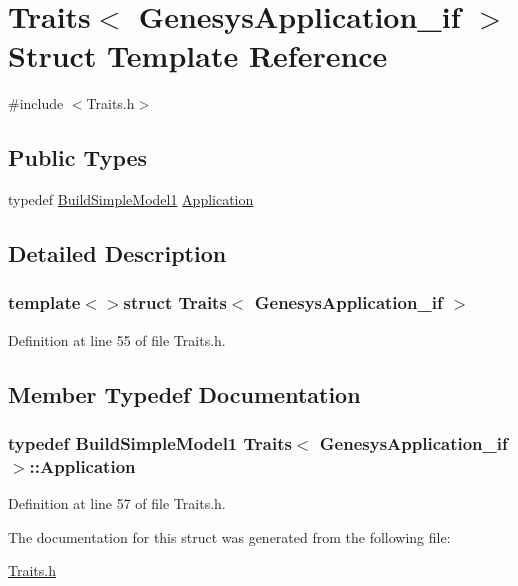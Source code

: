 \hypertarget{struct_traits_3_01_genesys_application__if_01_4}{\section{Traits$<$ Genesys\-Application\-\_\-if $>$ Struct Template Reference}
\label{struct_traits_3_01_genesys_application__if_01_4}
}


{\ttfamily \#include $<$Traits.\-h$>$}

\subsection*{Public Types}
\begin{DoxyCompactItemize}
\item 
typedef \hyperlink{class_build_simple_model1}{Build\-Simple\-Model1} \hyperlink{struct_traits_3_01_genesys_application__if_01_4_a0b06caaa4c4c9d58a95a3626ac969da7}{Application}
\end{DoxyCompactItemize}


\subsection{Detailed Description}
\subsubsection*{template$<$$>$struct Traits$<$ Genesys\-Application\-\_\-if $>$}



Definition at line 55 of file Traits.\-h.



\subsection{Member Typedef Documentation}
\hypertarget{struct_traits_3_01_genesys_application__if_01_4_a0b06caaa4c4c9d58a95a3626ac969da7}{
\subsubsection[{Application}]{\setlength{\rightskip}{0pt plus 5cm}typedef {\bf Build\-Simple\-Model1} {\bf Traits}$<$ {\bf Genesys\-Application\-\_\-if} $>$\-::{\bf Application}}}\label{struct_traits_3_01_genesys_application__if_01_4_a0b06caaa4c4c9d58a95a3626ac969da7}


Definition at line 57 of file Traits.\-h.



The documentation for this struct was generated from the following file\-:\begin{DoxyCompactItemize}
\item 
\hyperlink{_traits_8h}{Traits.\-h}\end{DoxyCompactItemize}
